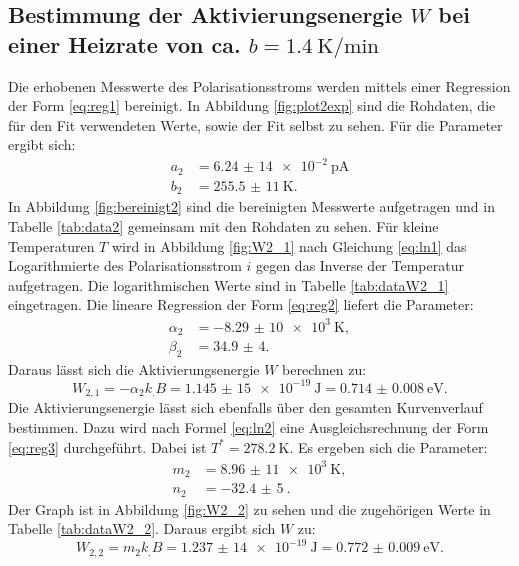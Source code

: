 \subsection{Bestimmung der Aktivierungsenergie $W$ bei einer Heizrate von ca. $b=\SI{1,4}{\kelvin\per\minute}$}

Die erhobenen Messwerte des Polarisationsstroms werden mittels einer Regression der Form \eqref{eq:reg1} bereinigt. In Abbildung \ref{fig:plot2exp} sind die Rohdaten, die für den Fit verwendeten Werte, sowie der Fit selbst zu sehen.
Für die Parameter ergibt sich:
\begin{align*}
a_2&=\SI{6,24(14)e-2}{\pico\ampere}\\
b_2&=\SI{255,5(11)}{\kelvin}\text{.}
\end{align*}
In Abbildung \ref{fig:bereinigt2} sind die bereinigten Messwerte aufgetragen und in Tabelle \ref{tab:data2} gemeinsam mit den Rohdaten zu sehen.
Für kleine Temperaturen $T$ wird in Abbildung \ref{fig:W2_1} nach Gleichung \eqref{eq:ln1} das Logarithmierte des Polarisationsstrom $i$ gegen das Inverse der Temperatur aufgetragen. Die logarithmischen Werte sind in Tabelle \ref{tab:dataW2_1} eingetragen.
Die lineare Regression der Form \eqref{eq:reg2} liefert die Parameter:
\begin{align*}
\alpha_2&=\SI{-8,29(10)e3}{\kelvin},\\
\beta_2 &= \num{34,9(4)}\text{.}
\end{align*}
Daraus lässt sich die Aktivierungsenergie $W$ berechnen zu:
\[
W_{2,1} = -\alpha_2 k_.B =\SI{1,145(15)e-19}{\joule}=\SI{0.714(8)}{\electronvolt}\text{.}
\]
Die Aktivierungsenergie lässt sich ebenfalls über den gesamten Kurvenverlauf bestimmen. Dazu wird nach Formel \eqref{eq:ln2} eine Ausgleichsrechnung der Form \eqref{eq:reg3} durchgeführt. Dabei ist $T^*=\SI{278,2}{\kelvin}$. Es ergeben sich die Parameter:
\begin{align*}
m_2&=\SI{8,96(11)e3}{\kelvin},\\
n_2&=\SI{-32,4(5)}{}\text{.}
\end{align*}
Der Graph ist in Abbildung \ref{fig:W2_2} zu sehen und die zugehörigen Werte in Tabelle \ref{tab:dataW2_2}.
Daraus ergibt sich $W$ zu:
\[
W_{2,2} = m_2 k_.B =\SI{1,237(14)e-19}{\joule}=\SI{0.772(9)}{\electronvolt}\text{.}
\]

